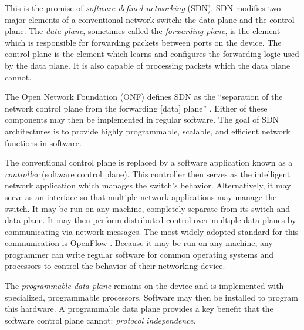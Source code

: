 This is the promise of \emph{software-defined networking} (SDN). 
SDN modifies two major elements of a conventional network switch: the data plane and the control plane. The \emph{data plane}, sometimes called the \emph{forwarding plane}, is the element which is responsible for forwarding packets between ports on the device. The control plane is the element which learns and configures the forwarding logic used by the data plane. It is also capable of processing packets which the data plane cannot.

The Open Network
Foundation (ONF) defines SDN as the ``separation of the network control
plane from the forwarding [data] plane'' \cite{onf_sdn_def}.
Either of these components may then be implemented in regular software.
The goal of SDN architectures is to provide highly programmable, scalable, and 
efficient network functions in software.

The conventional control plane is replaced by a software application known as a \emph{controller} (software control plane).
This controller then serves as the intelligent network application which manages the switch's behavior. 
Alternatively, it may serve as an interface so that multiple network applications may manage the switch.
It may be run on any machine, completely separate from its switch and data plane.
It may then perform distributed control over multiple data planes by communicating via network messages.
The most widely adopted standard for this communication is OpenFlow
\cite{openflow_spec}.
Because it may be run on any machine,
any programmer can write regular software for common operating
systems and processors to control the behavior of their networking device.

The \emph{programmable data plane} remains on the device and is implemented with specialized, programmable processors. 
Software may then be installed to program this hardware.
A programmable data plane provides
a key benefit that the software control plane cannot: \emph{protocol independence}.


